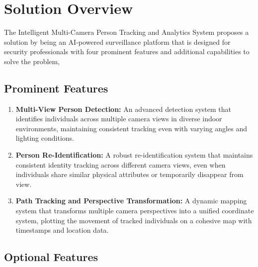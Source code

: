 \section{Solution Overview}
\label{section:solution-overview}

The Intelligent Multi-Camera Person Tracking and Analytics System proposes a solution by being an AI-powered surveillance platform
that is designed for security professionals with four prominent features and additional capabilities to solve the problem,

\subsection{Prominent Features}
\label{subsection:main-features}

\begin{enumerate}[leftmargin=80pt]
    \item \textbf{Multi-View Person Detection:} An advanced detection system that identifies individuals across multiple camera views in diverse indoor environments, maintaining consistent tracking even with varying angles and lighting conditions.
    
    \item \textbf{Person Re-Identification:} A robust re-identification system that maintains consistent identity tracking across different camera views, even when individuals share similar physical attributes or temporarily disappear from view.
    
    \item \textbf{Path Tracking and Perspective Transformation:} A dynamic mapping system that transforms multiple camera perspectives into a unified coordinate system, plotting the movement of tracked individuals on a cohesive map with timestamps and location data.
\end{enumerate}

\subsection{Optional Features}
\label{subsection:optional-features}


